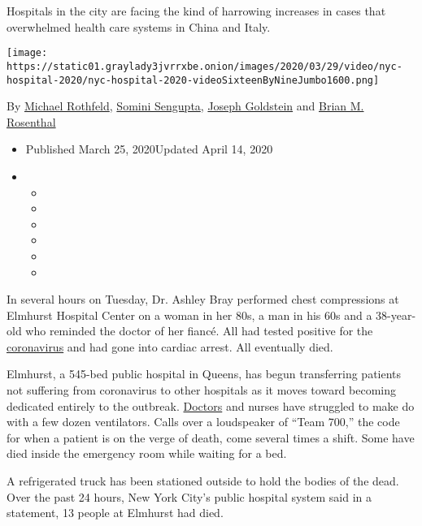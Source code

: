 Hospitals in the city are facing the kind of harrowing increases in
cases that overwhelmed health care systems in China and Italy.

\texttt{[image: https://static01.graylady3jvrrxbe.onion/images/2020/03/29/video/nyc-hospital-2020/nyc-hospital-2020-videoSixteenByNineJumbo1600.png]}

By \href{https://www.nytimes3xbfgragh.onion/by/michael-rothfeld}{Michael
Rothfeld},
\href{https://www.nytimes3xbfgragh.onion/by/somini-sengupta}{Somini
Sengupta},
\href{https://www.nytimes3xbfgragh.onion/by/joseph-goldstein}{Joseph
Goldstein} and
\href{https://www.nytimes3xbfgragh.onion/by/brian-m-rosenthal}{Brian M.
Rosenthal}

\begin{itemize}
\item
  Published March 25, 2020Updated April 14, 2020
\item
  \begin{itemize}
  \item
  \item
  \item
  \item
  \item
  \item
  \end{itemize}
\end{itemize}

In several hours on Tuesday, Dr. Ashley Bray performed chest
compressions at Elmhurst Hospital Center on a woman in her 80s, a man in
his 60s and a 38-year-old who reminded the doctor of her fiancé. All had
tested positive for the
\href{https://www.nytimes3xbfgragh.onion/2020/04/14/us/armen-henderson-arrested-homeless-coronavirus-testing.html}{coronavirus}
and had gone into cardiac arrest. All eventually died.

Elmhurst, a 545-bed public hospital in Queens, has begun transferring
patients not suffering from coronavirus to other hospitals as it moves
toward becoming dedicated entirely to the outbreak.
\href{https://www.nytimes3xbfgragh.onion/2020/04/14/us/armen-henderson-arrested-homeless-coronavirus-testing.html}{Doctors}
and nurses have struggled to make do with a few dozen ventilators. Calls
over a loudspeaker of ``Team 700,'' the code for when a patient is on
the verge of death, come several times a shift. Some have died inside
the emergency room while waiting for a bed.

A refrigerated truck has been stationed outside to hold the bodies of
the dead. Over the past 24 hours, New York City's public hospital system
said in a statement, 13 people at Elmhurst had died.


